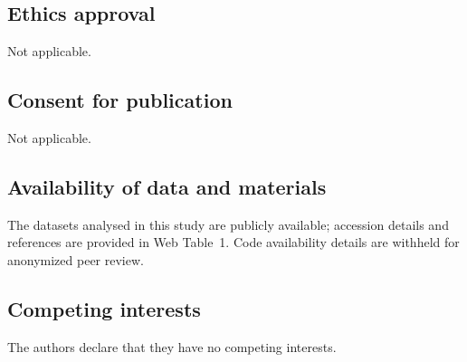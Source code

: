 \documentclass[Review,doublespace,sageh,times]{sagej}
\begin{document}
\subsection*{Ethics approval}
Not applicable.

\subsection*{Consent for publication}
Not applicable.

\subsection*{Availability of data and materials}
The datasets analysed in this study are publicly available; accession details and references are provided in Web Table~1.
Code availability details are withheld for anonymized peer review.

\subsection*{Competing interests}
The authors declare that they have no competing interests.



\end{document}
